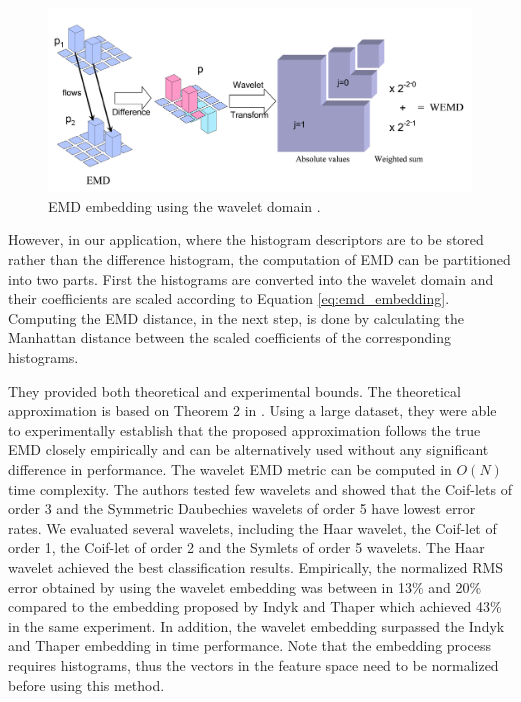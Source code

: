 \begin{figure}
\centering
\includegraphics[width=1\textwidth]{./figures/emd_wavelet}       
\caption{EMD embedding using the wavelet domain \cite{shirdhonkar2008approximate}.}
\label{fig:emd_wavelet} 
\end{figure}

\iftoggle{edit-mode}{\hspace{0pt}\marginpar{Embedding the histograms rather than the difference histogram}}{}
However, in our application, where the histogram descriptors are to be stored rather than the difference histogram, the computation of EMD can be partitioned into two parts. First the histograms are converted into the wavelet domain and their coefficients are scaled according to Equation \ref{eq:emd_embedding}. 
Computing the EMD distance, in the next step, is done by calculating the Manhattan distance between the scaled coefficients of the corresponding histograms.

\iftoggle{edit-mode}{\hspace{0pt}\marginpar{shirdhonkar - theoretical and empirical bounds}}{}
They provided both theoretical and experimental bounds. The theoretical approximation is based on Theorem 2 in \cite{shirdhonkar2008approximate}. Using a large dataset, they were able to experimentally establish that the proposed approximation follows the true EMD closely empirically and can be alternatively used without any significant difference in performance. The wavelet EMD metric can be computed in $O\left( N \right)$ time complexity. The authors tested few wavelets and showed that the Coif-lets of order 3 and the Symmetric Daubechies wavelets of order 5 have lowest error rates. 
We evaluated several wavelets, including the Haar wavelet, the Coif-let of order 1, the Coif-let of order 2 and the Symlets of order 5 wavelets.
The Haar wavelet achieved the best classification results.
\iftoggle{edit-mode}{\hspace{0pt}\marginpar{Performance - Indyk vs. shirdhonkar}}{}
Empirically, the normalized RMS error obtained by using the wavelet embedding was between in 13\% and 20\% compared to the embedding proposed by Indyk and Thaper which achieved 43\% in the same experiment. In addition, the wavelet embedding surpassed the Indyk and Thaper embedding in time performance. Note that the embedding process requires histograms, thus the vectors in the feature space need to be normalized before using this method.

